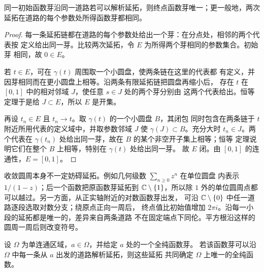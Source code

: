 \begin{proposition}[沿固定道路延拓的唯一性]
\label{prop:continuation-fixed-path-unique}
同一初始函数芽沿同一道路若可以解析延拓，则终点函数芽唯一；更一般地，两次
延拓在道路的每个参数处所得函数芽都相同。
\end{proposition}

\begin{proof}
每一条延拓链都在道路的每个参数处给出一个芽：在分点处，相邻的两个代表按
定义给出同一芽。比较两次延拓，令 $E$ 为所得两个芽相同的参数集合。初始芽
相同，故 $0\in E$。

若 $t\in E$，可在 $\gamma(t)$ 周围取一个小圆盘，使两条链在这里的代表都
有定义，并因芽相同而在更小圆盘上相等。沿两条有限延拓链把圆盘再缩小后，
存在 $t$ 在 $[0,1]$ 中的相对邻域 $J$，使任意 $s\in J$ 处的两个芽分别由
这两个代表给出。恒等定理于是给 $J\subset E$，所以 $E$ 是开集。

再设 $t_n\in E$ 且 $t_n\to t$。取 $\gamma(t)$ 的一个小圆盘 $B$，其闭包
同时包含在两条链于 $t$ 附近所用代表的定义域中，并取参数邻域 $J$ 使
\(\gamma(J)\subset B\)。充分大时 \(t_n\in J\)。两个代表在
\(\gamma(t_n)\) 处给出同一芽，故在 \(B\) 的某个非空开子集上相等；恒等
定理说明它们在整个 \(B\) 上相等，特别在 \(\gamma(t)\) 处给出同一芽。
故 $E$ 闭。由 $[0,1]$ 的连通性，$E=[0,1]$。
\end{proof}

收敛圆周本身不一定妨碍延拓。例如几何级数 $\sum_{n\ge0}z^n$ 在单位圆盘
内表示 $1/(1-z)$；后一个函数把原函数芽延拓到 $\mathbb{C}\setminus\{1\}$，所以除
$1$ 外的单位圆周点都可以越过。另一方面，从正实轴附近的对数函数芽出发，
可沿 $\mathbb{C}\setminus\{0\}$ 中任一道路逐段选取对数分支；绕原点正向一周后，
终点值比初始值增加 $2\pi i$。沿每一小段的延拓都是唯一的，差异来自两条道路
不在固定端点下同伦。平方根沿这样的圆周一周后则改变符号。

\begin{theorem}[单值性定理]\label{thm:monodromy}
设 $\Omega$ 为单连通区域，$a\in\Omega$，并给定 $a$ 处的一个全纯函数芽。
若该函数芽可以沿 $\Omega$ 中每一条从 $a$ 出发的道路解析延拓，则这些延拓
共同确定 $\Omega$ 上唯一的全纯函数。
\end{theorem}

